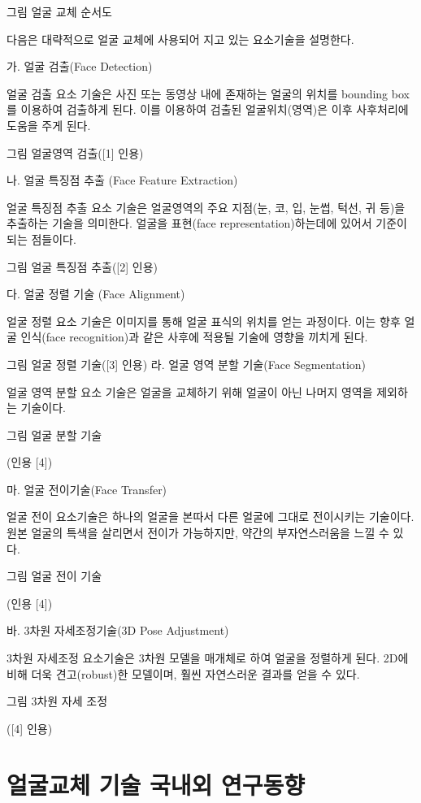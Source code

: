 \documentclass{oblivoir}
\begin{document}
                                그림  얼굴 교체 순서도

                                다음은 대략적으로 얼굴 교체에 사용되어 지고 있는 요소기술을 설명한다.

가. 얼굴 검출(Face Detection)

 얼굴 검출 요소 기술은 사진 또는 동영상 내에 존재하는 얼굴의 위치를 bounding box를 이용하여 검출하게 된다. 이를 이용하여 검출된 얼굴위치(영역)은 이후 사후처리에 도움을 주게 된다.

                     그림  얼굴영역 검출([1] 인용)

나. 얼굴 특징점 추출 (Face Feature Extraction)

얼굴 특징점 추출 요소 기술은 얼굴영역의 주요 지점(눈, 코, 입, 눈썹, 턱선, 귀 등)을 추출하는 기술을 의미한다. 얼굴을 표현(face representation)하는데에 있어서 기준이 되는 점들이다.

그림  얼굴 특징점 추출([2] 인용)

                                 다. 얼굴 정렬 기술 (Face Alignment)

얼굴 정렬 요소 기술은 이미지를 통해 얼굴 표식의 위치를 얻는 과정이다. 이는 향후 얼굴 인식(face recognition)과 같은 사후에 적용될 기술에 영향을 끼치게 된다.

그림  얼굴 정렬 기술([3] 인용)
                 라. 얼굴 영역 분할 기술(Face Segmentation)

얼굴 영역 분할 요소 기술은 얼굴을 교체하기 위해 얼굴이 아닌 나머지 영역을 제외하는 기술이다.

                           그림  얼굴 분할 기술

(인용 [4])

 마. 얼굴 전이기술(Face Transfer)

얼굴 전이 요소기술은 하나의 얼굴을 본따서 다른 얼굴에 그대로 전이시키는 기술이다. 원본 얼굴의 특색을 살리면서 전이가 가능하지만, 약간의 부자연스러움을 느낄 수 있다.

그림  얼굴 전이 기술

(인용 [4])

                          바.  3차원 자세조정기술(3D Pose Adjustment)

3차원 자세조정 요소기술은 3차원 모델을 매개체로 하여 얼굴을 정렬하게 된다. 2D에 비해 더욱 견고(robust)한 모델이며, 훨씬 자연스러운 결과를 얻을 수 있다. 

                                  그림  3차원 자세 조정

([4] 인용)

                                      \section{얼굴교체 기술 국내외 연구동향}
\end{document}
